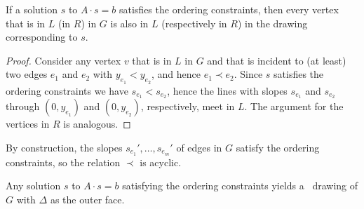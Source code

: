 \begin{obs}
If a solution $s$ to $A\cdot s=b$ satisfies the ordering constraints, then every vertex that is in $L$ (in $R$) in $G$ is also in $L$ (respectively in $R$) in the drawing corresponding to $s$. 
\end{obs}

\begin{proof}	  
Consider any vertex $v$ that is in $L$ in $G$ and that is incident to
(at least) two edges $e_1$ and $e_2$ with $y_{e_1} < y_{e_2}$, and hence $e_1 \prec e_2$. Since $s$ satisfies the ordering constraints we have $s_{e_1} < s_{e_2}$, hence the lines with slopes $s_{e_1}$ and $s_{e_2}$ through $(0,y_{e_1})$ and $(0,y_{e_2})$, respectively, meet in $L$. The argument for the vertices in $R$ is analogous. 
\end{proof}	  

By construction, the slopes $s_{e_1}',\ldots,s_{e_m}'$ of edges
in $G$ satisfy the ordering constraints, so the relation $\prec$ is acyclic.

\begin{lem}
	Any solution $s$ to $A\cdot s=b$ satisfying
	the ordering constraints %
	yields a
	\Fary\ drawing of $G$ with $\Delta$ as the outer face.
\end{lem}

